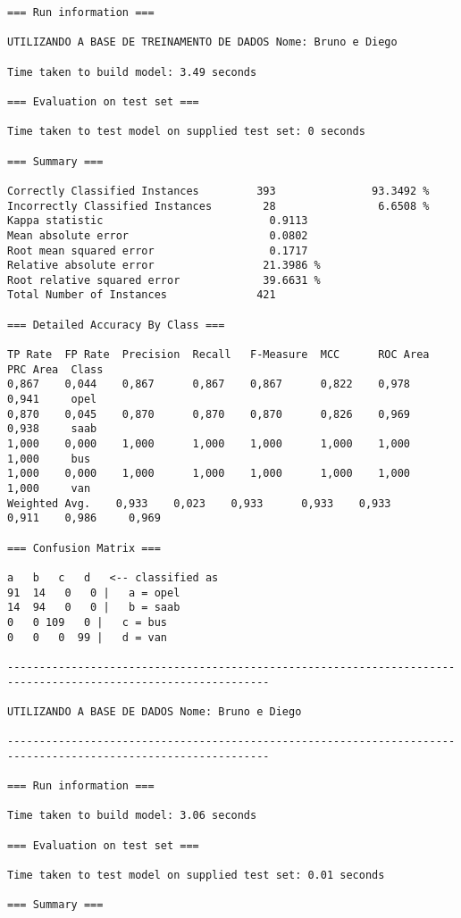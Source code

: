 \documentclass[
	article,			%
	11pt,				%
	oneside,			%
	a4paper,			%
	english,			%
	brazil,				%
	sumario=tradicional
	]{abntex2}
\begin{document}
\begin{lstlisting}
=== Run information ===

UTILIZANDO A BASE DE TREINAMENTO DE DADOS Nome: Bruno e Diego

Time taken to build model: 3.49 seconds

=== Evaluation on test set ===

Time taken to test model on supplied test set: 0 seconds

=== Summary ===

Correctly Classified Instances         393               93.3492 %
Incorrectly Classified Instances        28                6.6508 %
Kappa statistic                          0.9113
Mean absolute error                      0.0802
Root mean squared error                  0.1717
Relative absolute error                 21.3986 %
Root relative squared error             39.6631 %
Total Number of Instances              421     

=== Detailed Accuracy By Class ===

TP Rate  FP Rate  Precision  Recall   F-Measure  MCC      ROC Area  PRC Area  Class
0,867    0,044    0,867      0,867    0,867      0,822    0,978     0,941     opel
0,870    0,045    0,870      0,870    0,870      0,826    0,969     0,938     saab
1,000    0,000    1,000      1,000    1,000      1,000    1,000     1,000     bus
1,000    0,000    1,000      1,000    1,000      1,000    1,000     1,000     van
Weighted Avg.    0,933    0,023    0,933      0,933    0,933      0,911    0,986     0,969     

=== Confusion Matrix ===

a   b   c   d   <-- classified as
91  14   0   0 |   a = opel
14  94   0   0 |   b = saab
0   0 109   0 |   c = bus
0   0   0  99 |   d = van

---------------------------------------------------------------------------------------------------------------

UTILIZANDO A BASE DE DADOS Nome: Bruno e Diego

---------------------------------------------------------------------------------------------------------------

=== Run information ===

Time taken to build model: 3.06 seconds

=== Evaluation on test set ===

Time taken to test model on supplied test set: 0.01 seconds

=== Summary ===


\end{lstlisting}
\end{document}
